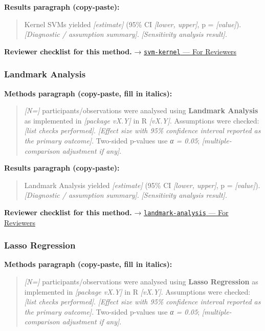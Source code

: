 \documentclass[
]{article}
\begin{document}
\textbf{Results paragraph (copy-paste):}

\begin{quote}
Kernel SVMs yielded \emph{{[}estimate{]}} (95\% CI \emph{{[}lower,
upper{]}}, p = \emph{{[}value{]}}). \emph{{[}Diagnostic / assumption
summary{]}}. \emph{{[}Sensitivity analysis result{]}}.
\end{quote}

\textbf{Reviewer checklist for this method.} →
\href{../chapters/13-ml/svm-kernel.Rmd\#for-reviewers}{\texttt{svm-kernel}
--- For Reviewers}

\subsubsection{Landmark Analysis}\label{landmark-analysis}

\textbf{Methods paragraph (copy-paste, fill in italics):}

\begin{quote}
\emph{{[}N={]}} participants/observations were analysed using
\textbf{Landmark Analysis} as implemented in \emph{{[}package vX.Y{]}}
in R \emph{{[}vX.Y{]}}. Assumptions were checked: \emph{{[}list checks
performed{]}}. \emph{{[}Effect size with 95\% confidence interval
reported as the primary outcome{]}}. Two-sided p-values use \emph{α =
0.05}; \emph{{[}multiple-comparison adjustment if any{]}}.
\end{quote}

\textbf{Results paragraph (copy-paste):}

\begin{quote}
Landmark Analysis yielded \emph{{[}estimate{]}} (95\% CI \emph{{[}lower,
upper{]}}, p = \emph{{[}value{]}}). \emph{{[}Diagnostic / assumption
summary{]}}. \emph{{[}Sensitivity analysis result{]}}.
\end{quote}

\textbf{Reviewer checklist for this method.} →
\href{../chapters/11-survival/landmark-analysis.Rmd\#for-reviewers}{\texttt{landmark-analysis}
--- For Reviewers}

\subsubsection{Lasso Regression}\label{lasso-regression}

\textbf{Methods paragraph (copy-paste, fill in italics):}

\begin{quote}
\emph{{[}N={]}} participants/observations were analysed using
\textbf{Lasso Regression} as implemented in \emph{{[}package vX.Y{]}} in
R \emph{{[}vX.Y{]}}. Assumptions were checked: \emph{{[}list checks
performed{]}}. \emph{{[}Effect size with 95\% confidence interval
reported as the primary outcome{]}}. Two-sided p-values use \emph{α =
0.05}; \emph{{[}multiple-comparison adjustment if any{]}}.
\end{quote}
\end{document}

